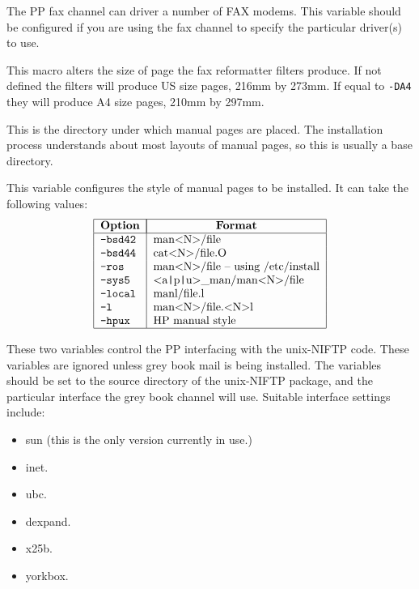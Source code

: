 \begin{describe}
\item[\verb|FAXDIRVERS|:]
The PP fax channel can driver a number of FAX modems. This variable
should be configured if you are using the fax channel to specify the
particular driver(s) to use.

\item[\verb|FAXPAGESIZE|:]
This macro alters the size of page the fax reformatter filters
produce.
If not defined the filters will produce US size pages, 216mm by 273mm.
If equal to \verb+-DA4+ they will produce A4 size pages, 210mm by
297mm.

\item[\verb|MANDIR|:] This is the directory under which
manual pages are placed. The installation process understands about
most layouts of manual pages, so this is usually a base directory.

\item[\verb|MANOPTS|:] This variable configures the
style of manual pages to be installed. It can take the following
values:
\[\begin{tabular}{|l | l|}
\hline
	\multicolumn{1}{|c|}{\bf Option} & 
		\multicolumn{1}{|c|}{\bf Format}\\
\hline
	\tt -bsd42 & man$<$N$>$/file \\
	\tt -bsd44 & cat$<$N$>$/file.O \\
	\tt -ros & man$<$N$>$/file -- using /etc/install\\
	\tt -sys5 & $<$a\verb+|+p\verb+|+u$>$\_man/man$<$N$>$/file\\
	\tt -local & manl/file.l\\
	\tt -l & man$<$N$>$/file.$<$N$>$l\\
	\tt -hpux & HP manual style\\
\hline
\end{tabular}\]

\item[\verb|NIFTPSRC|/\verb|NIFTPINTERFACE|:] These two variables
control the PP interfacing with the unix-NIFTP code. These variables
are ignored unless grey book mail is being installed. The variables
should be set to the source directory of the unix-NIFTP package, and
the particular interface the grey book channel will use. Suitable
interface settings include:
\begin{itemize}
\item sun (this is the only version currently in use.)
\item inet.
\item ubc.
\item dexpand.
\item x25b.
\item yorkbox.
\end{itemize}



\end{describe}
